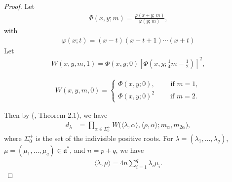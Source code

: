 \documentclass[11pt,a4paper]{amsart}
\theoremstyle{definition}
\numberwithin{equation}{section}
\begin{document}
\begin{proof}
Let
\begin{align*}
\Phi(x,y;m)= \frac{\varphi(x+y;\, m)}{\varphi(y;\, m)},
\end{align*}
with 
\begin{align*}
\varphi(x;t)= (x - t)(x - t + 1)\cdots(x + t)
\end{align*} 
Let
\begin{align*}
W(x,y,m,1)= \Phi(x,y;0)\left[\Phi\left(x,y;\frac{1}{4}m-\frac{1}{2}  \right) \right]^2,
\end{align*}

\begin{align*}
W(x,y,m,0)= \begin{cases} 
\Phi(x,y;0), \;\;\;\;\;\;\; \text{ if }m=1,\\
\Phi(x,y;0)^2\;\;\;\;\;\;\; \text{ if } m=2.
\end{cases}
\end{align*}

Then by  (\cite{Goodman}, Theorem 2.1), we have
\begin{align*}
d_\lambda &= \prod_{\alpha\in \Sigma^+_0} W\Big( \langle \lambda, \alpha\rangle, \langle \rho ,\alpha\rangle ; m_{\alpha},m_{2\alpha}\Big),
\end{align*} 
where $\Sigma_0^+$ is the set of the indivisible positive roots.
For   $\lambda=( \lambda_1,\dots , \lambda_q)$,   \\$ \mu=( \mu_1,\dots , \mu_q) \in \mathfrak{a}^*$, and $n=p+q$, we have
\begin{align*}
\langle \lambda, \mu \rangle  = 4n \sum_{i=1}^q \lambda_i\mu_i. 
\end{align*} 


\end{proof}
\end{document}
